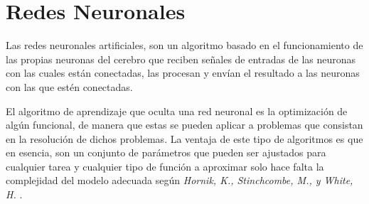 \newpage
\section{Redes Neuronales}

\noindent Las redes neuronales artificiales, son un algoritmo basado en el funcionamiento de las propias neuronas del cerebro que reciben señales de entradas de las neuronas con las cuales están conectadas, las procesan y envían el resultado a las neuronas con las que estén conectadas. 

\noindent El algoritmo de aprendizaje que oculta una red neuronal es la optimización de algún funcional, de manera que estas se pueden aplicar a problemas que consistan en la resolución de dichos problemas. La ventaja de este tipo de algoritmos es que en esencia, son un conjunto de parámetros que pueden ser ajustados para cualquier tarea y cualquier tipo de función a aproximar solo hace falta la complejidad del modelo adecuada según \emph{Hornik, K., Stinchcombe, M., y  White, H.} \cite{Hornik 1989}.  

